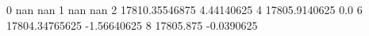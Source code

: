 0 nan nan
1 nan nan
2 17810.35546875 4.44140625
4 17805.9140625 0.0
6 17804.34765625 -1.56640625
8 17805.875 -0.0390625
